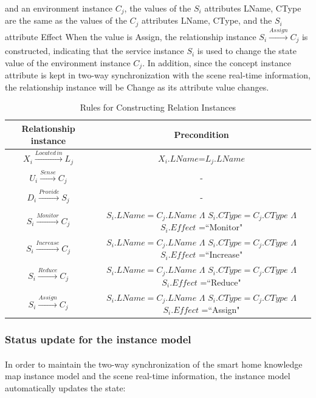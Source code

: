 and an environment instance $C_{j}$, the values of the $S_{i}$ attributes LName, CType are the same as the values of the $C_{j}$ attributes LName, CType, and the $S_{i}$ attribute Effect When the value is Assign, the relationship instance $S_{i}\xrightarrow[]{Assign}C_{j}$ is constructed, indicating that the service instance $S_{i}$ is used to change the state value of the environment instance $C_{j}$. In addition, since the concept instance attribute is kept in two-way synchronization with the scene real-time information, the relationship instance will be Change as its attribute value changes.

\begin{table}[htbp]
	\caption{Rules for Constructing Relation Instances}
	\centering  %
	\label{table5}  %
	\renewcommand\arraystretch{1.5}  %
	\begin{tabular}{|c|c|}  %
		\hline
		Relationship instance & Precondition \\
		\hline
		$X_{i}\xrightarrow[]{Located\,in}L_{j}$ & $X_{i}.LName$=$L_{j}.LName$ \\
		\hline		
		$U_{i}\xrightarrow[]{Sense} C_{j}$      & - \\
		\hline		
		$D_{i}\xrightarrow[]{Provide}S_{j}$     & - \\
		\hline		
		$S_{i}\xrightarrow[]{Monitor}C_{j}$     & $S_{i}.LName=C_{j}.LName$ $\Lambda$ $S_{i}.CType=C_{j}.CType$ $\Lambda$ $S_{i}.Effect$ =``Monitor"\\
		\hline		
		$S_{i}\xrightarrow[]{Increase}C_{j}$    & $S_{i}.LName=C_{j}.LName$ $\Lambda$ $S_{i}.CType=C_{j}.CType$ $\Lambda$ $S_{i}.Effect$ =``Increase"\\
		\hline	
		$S_{i}\xrightarrow[]{Reduce}C_{j}$      & $S_{i}.LName=C_{j}.LName$ $\Lambda$ $S_{i}.CType=C_{j}.CType$ $\Lambda$ $S_{i}.Effect$ =``Reduce"\\
		\hline
		$S_{i}\xrightarrow[]{Assign}C_{j}$      & $S_{i}.LName=C_{j}.LName$ $\Lambda$ $S_{i}.CType=C_{j}.CType$ $\Lambda$ $S_{i}.Effect$ =``Assign"\\
		\hline
	\end{tabular}
\end{table}

\subsubsection{Status update for the instance model}
\paragraph{}
In order to maintain the two-way synchronization of the smart home knowledge map instance model and the scene real-time information, the instance model automatically updates the state:

